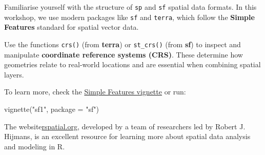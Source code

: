 \documentclass[
]{book}
\newenvironment{Shaded}{\begin{snugshade}}{\end{snugshade}}
\newcommand{\AttributeTok}[1]{\textcolor[rgb]{0.40,0.45,0.13}{#1}}
\newcommand{\FunctionTok}[1]{\textcolor[rgb]{0.28,0.35,0.67}{#1}}
\newcommand{\NormalTok}[1]{\textcolor[rgb]{0.00,0.23,0.31}{#1}}
\newcommand{\StringTok}[1]{\textcolor[rgb]{0.13,0.47,0.30}{#1}}
\begin{document}
\begin{tcolorbox}[enhanced jigsaw, left=2mm, bottomtitle=1mm, colframe=quarto-callout-note-color-frame, title=\textcolor{quarto-callout-note-color}{\faInfo}\hspace{0.5em}{Understanding spatial data structures in R}, breakable, coltitle=black, leftrule=.75mm, bottomrule=.15mm, arc=.35mm, toprule=.15mm, colback=white, toptitle=1mm, rightrule=.15mm, titlerule=0mm, opacityback=0, colbacktitle=quarto-callout-note-color!10!white, opacitybacktitle=0.6]

Familiarise yourself with the structure of \texttt{sp} and \texttt{sf}
spatial data formats. In this workshop, we use modern packages like
\texttt{sf} and \texttt{terra}, which follow the \textbf{Simple
Features} standard for spatial vector data.

Use the functions \texttt{crs()} (from \textbf{terra}) or
\texttt{st\_crs()} (from \textbf{sf}) to inspect and manipulate
\textbf{coordinate reference systems (CRS)}. These determine how
geometries relate to real-world locations and are essential when
combining spatial layers.

To learn more, check the
\href{https://r-spatial.github.io/sf/articles/sf1.html}{Simple Features
vignette} or run:

\begin{Shaded}
\begin{Highlighting}[]
\FunctionTok{vignette}\NormalTok{(}\StringTok{"sf1"}\NormalTok{, }\AttributeTok{package =} \StringTok{"sf"}\NormalTok{)}
\end{Highlighting}
\end{Shaded}

The website\href{https://rspatial.org/}{rspatial.org}, developed by a
team of researchers led by Robert J. Hijmans, is an excellent resource
for learning more about spatial data analysis and modeling in R.

\end{tcolorbox}
\end{document}
